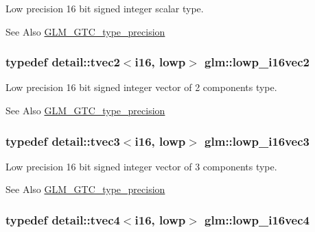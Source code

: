 Low precision 16 bit signed integer scalar type. \begin{DoxySeeAlso}{See Also}
\hyperlink{group__gtc__type__precision}{G\-L\-M\-\_\-\-G\-T\-C\-\_\-type\-\_\-precision} 
\end{DoxySeeAlso}
\hypertarget{group__gtc__type__precision_ga47c5d4c919266799ecc76d832356feff}{
\subsubsection[{lowp\-\_\-i16vec2}]{\setlength{\rightskip}{0pt plus 5cm}typedef detail\-::tvec2$<$i16, lowp$>$ {\bf glm\-::lowp\-\_\-i16vec2}}}\label{group__gtc__type__precision_ga47c5d4c919266799ecc76d832356feff}
Low precision 16 bit signed integer vector of 2 components type. \begin{DoxySeeAlso}{See Also}
\hyperlink{group__gtc__type__precision}{G\-L\-M\-\_\-\-G\-T\-C\-\_\-type\-\_\-precision} 
\end{DoxySeeAlso}
\hypertarget{group__gtc__type__precision_ga5b71f24a26316aa21f3c58d25c8db9a8}{
\subsubsection[{lowp\-\_\-i16vec3}]{\setlength{\rightskip}{0pt plus 5cm}typedef detail\-::tvec3$<$i16, lowp$>$ {\bf glm\-::lowp\-\_\-i16vec3}}}\label{group__gtc__type__precision_ga5b71f24a26316aa21f3c58d25c8db9a8}
Low precision 16 bit signed integer vector of 3 components type. \begin{DoxySeeAlso}{See Also}
\hyperlink{group__gtc__type__precision}{G\-L\-M\-\_\-\-G\-T\-C\-\_\-type\-\_\-precision} 
\end{DoxySeeAlso}
\hypertarget{group__gtc__type__precision_ga59ea63973187e1e990fb6633d1800c6d}{
\subsubsection[{lowp\-\_\-i16vec4}]{\setlength{\rightskip}{0pt plus 5cm}typedef detail\-::tvec4$<$i16, lowp$>$ {\bf glm\-::lowp\-\_\-i16vec4}}}\label{group__gtc__type__precision_ga59ea63973187e1e990fb6633d1800c6d}
